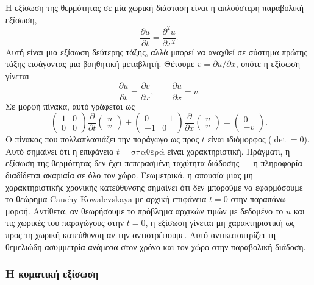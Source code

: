 \documentclass[12pt]{article}
\begin{document}
Η εξίσωση της θερμότητας σε μία χωρική διάσταση είναι η απλούστερη παραβολική εξίσωση,
\begin{equation}
\frac{\partial u}{\partial t} = \frac{\partial^2 u}{\partial x^2}.
\end{equation}
Αυτή είναι μια εξίσωση δεύτερης τάξης, αλλά μπορεί να αναχθεί σε σύστημα πρώτης τάξης εισάγοντας μια βοηθητική μεταβλητή. Θέτουμε $v = \partial u / \partial x$, οπότε η εξίσωση γίνεται
\[
\frac{\partial u}{\partial t} = \frac{\partial v}{\partial x}, \qquad \frac{\partial u}{\partial x} = v.
\]
Σε μορφή πίνακα, αυτό γράφεται ως
\begin{equation}
\begin{pmatrix} 1 & 0 \\ 0 & 0 \end{pmatrix} \frac{\partial}{\partial t} \begin{pmatrix} u \\ v \end{pmatrix} + \begin{pmatrix} 0 & -1 \\ -1 & 0 \end{pmatrix} \frac{\partial}{\partial x} \begin{pmatrix} u \\ v \end{pmatrix} = \begin{pmatrix} 0 \\ -v \end{pmatrix}.
\end{equation}
Ο πίνακας που πολλαπλασιάζει την παράγωγο ως προς $t$ είναι ιδιόμορφος ($\det = 0$). Αυτό σημαίνει ότι η επιφάνεια $t = \text{σταθερά}$ είναι χαρακτηριστική. Πράγματι, η εξίσωση της θερμότητας δεν έχει πεπερασμένη ταχύτητα διάδοσης — η πληροφορία διαδίδεται ακαριαία σε όλο τον χώρο. Γεωμετρικά, η απουσία μιας μη χαρακτηριστικής χρονικής κατεύθυνσης σημαίνει ότι δεν μπορούμε να εφαρμόσουμε το θεώρημα Cauchy-Kowalevskaya με αρχική επιφάνεια $t = 0$ στην παραπάνω μορφή. Αντίθετα, αν θεωρήσουμε το πρόβλημα αρχικών τιμών με δεδομένο το $u$ και τις χωρικές του παραγώγους στην $t=0$, η εξίσωση γίνεται μη χαρακτηριστική ως προς τη χωρική κατεύθυνση αν την αντιστρέψουμε. Αυτό αντικατοπτρίζει τη θεμελιώδη ασυμμετρία ανάμεσα στον χρόνο και τον χώρο στην παραβολική διάδοση.

\subsubsection{Η κυματική εξίσωση}
\end{document}
